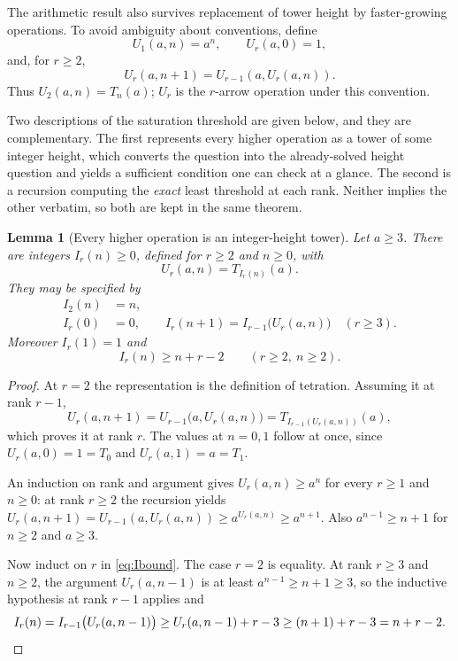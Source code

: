 \documentclass[11pt,letterpaper]{article}
\numberwithin{equation}{section}
\newtheorem{lemma}[theorem]{Lemma}
\theoremstyle{definition}
\theoremstyle{remark}
\begin{document}
The arithmetic result also survives replacement of tower height by faster-growing operations. To avoid ambiguity about conventions, define
\[
 U_1(a,n)=a^n,\qquad U_r(a,0)=1,
\]
and, for $r\ge2$,
\begin{equation}\label{eq:up-arrow-def}
 U_r(a,n+1)=U_{r-1}(a,U_r(a,n)).
\end{equation}
Thus $U_2(a,n)=T_n(a)$; $U_r$ is the $r$-arrow operation under this convention.

Two descriptions of the saturation threshold are given below, and they are complementary. The first represents every higher operation as a tower of some integer height, which converts the question into the already-solved height question and yields a sufficient condition one can check at a glance. The second is a recursion computing the \emph{exact} least threshold at each rank. Neither implies the other verbatim, so both are kept in the same theorem.

\begin{lemma}[Every higher operation is an integer-height tower]\label{lem:height}
Let $a\ge3$. There are integers $I_r(n)\ge0$, defined for $r\ge2$ and $n\ge0$, with
\[
 U_r(a,n)=T_{I_r(n)}(a).
\]
They may be specified by
\begin{align}
 I_2(n)&=n,\label{eq:Ibase}\\
 I_r(0)&=0,\qquad I_r(n+1)=I_{r-1}\bigl(U_r(a,n)\bigr)\quad(r\ge3).\label{eq:Irec}
\end{align}
Moreover $I_r(1)=1$ and
\begin{equation}\label{eq:Ibound}
 I_r(n)\ge n+r-2\qquad(r\ge2,\ n\ge2).
\end{equation}
\end{lemma}
\begin{proof}
At $r=2$ the representation is the definition of tetration. Assuming it at rank $r-1$,
\[
 U_r(a,n+1)=U_{r-1}\bigl(a,U_r(a,n)\bigr)=T_{I_{r-1}(U_r(a,n))}(a),
\]
which proves it at rank $r$. The values at $n=0,1$ follow at once, since $U_r(a,0)=1=T_0$ and $U_r(a,1)=a=T_1$.

An induction on rank and argument gives $U_r(a,n)\ge a^n$ for every $r\ge1$ and $n\ge0$: at rank $r\ge2$ the recursion yields $U_r(a,n+1)=U_{r-1}(a,U_r(a,n))\ge a^{U_r(a,n)}\ge a^{n+1}$. Also $a^{n-1}\ge n+1$ for $n\ge2$ and $a\ge3$.

Now induct on $r$ in \eqref{eq:Ibound}. The case $r=2$ is equality. At rank $r\ge3$ and $n\ge2$, the argument $U_r(a,n-1)$ is at least $a^{n-1}\ge n+1\ge3$, so the inductive hypothesis at rank $r-1$ applies and
\[
 I_r(n)=I_{r-1}\bigl(U_r(a,n-1)\bigr)\ge U_r(a,n-1)+r-3\ge (n+1)+r-3=n+r-2. \qedhere
\]
\end{proof}
\end{document}

